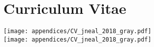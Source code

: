 \chapter{Curriculum Vitae}
\label{app_ch:cv}
{\centering
    {\texttt{[image: appendices/CV\_jneal\_2018\_gray.pdf]}}\\
    {\texttt{[image: appendices/CV\_jneal\_2018\_gray.pdf]}}
}
\clearpage
